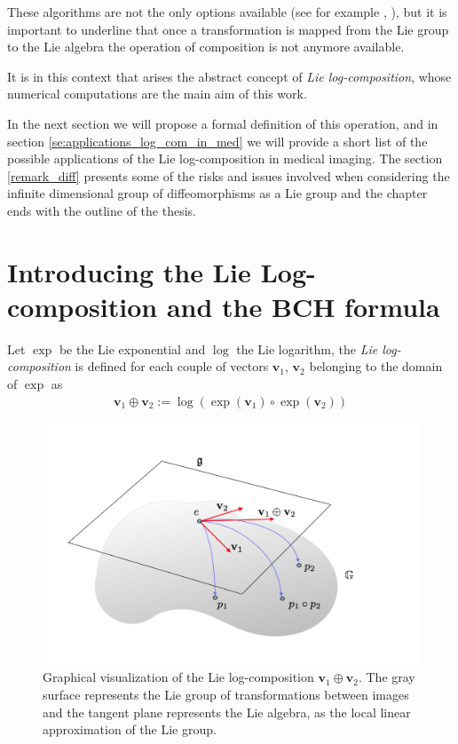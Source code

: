 These algorithms are not the only options available (see for example \cite{bossa2008algorithms}, \cite{bossa2008new}), but it is important to underline that once a transformation is mapped from the Lie group to the Lie algebra the operation of composition is not anymore available. 

It is in this context that arises the abstract concept of \emph{Lie log-composition}, whose numerical computations are the main aim of this work.

In the next section we will propose a formal definition of this operation, and in section \ref{se:applications_log_com_in_med} we will provide a short list of the possible applications of the Lie log-composition in medical imaging. 
The section \ref{remark_diff} presents some of the risks and issues involved when considering the infinite dimensional group of diffeomorphisms as a Lie group and the chapter ends with the outline of the thesis.

\section{Introducing the Lie Log-composition and the BCH formula}\label{se:introducing_log_composition}

% 
Let $\exp$ be the Lie exponential  and $\log$ the Lie logarithm, the \emph{Lie log-composition} is defined for each couple of vectors $\mathbf{v}_1$, $\mathbf{v}_2$ belonging to the domain of $\exp$ as
\begin{align}\label{eq:bch_problem}
\mathbf{v}_1 \oplus \mathbf{v}_2 := \log(\exp(\mathbf{v}_1)\circ\exp(\mathbf{v}_2))
\end{align}

\begin{figure}[!ht]
	\centering
	\includegraphics[scale=0.35]{figures/log_composition.pdf}
	\caption{Graphical visualization of the Lie log-composition $\mathbf{v}_{1}\oplus \mathbf{v}_{2}$. The gray surface represents the Lie group of transformations between images and the tangent plane represents the Lie algebra, as the local linear approximation of the Lie group. }
	\label{fig:composition}
\end{figure}


